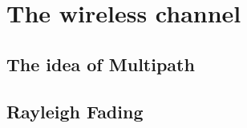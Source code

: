 




\chapter{The wireless channel}




\section{The idea of Multipath}


\section{Rayleigh Fading}


